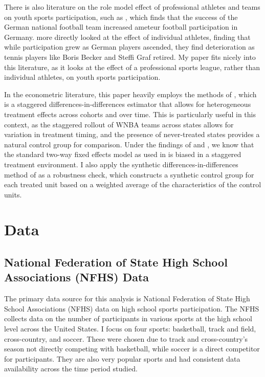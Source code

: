\documentclass[11pt]{article}
\newcommand{\1}[1]{\mathbb{I}\{#1\}}
\theoremstyle{plain}
\begin{document}
There is also literature on the role model effect of professional athletes and teams on youth sports participation, such as \citet{frick_trickle-down_2016}, which finds that the success of the German national football team increased ameteur football participation in Germany. \citet{feddersen_sports_2009} more directly looked at the effect of individual athletes, finding that while participation grew as German players ascended, they find deterioration as tennis players like Boris Becker and Steffi Graf retired. My paper fits nicely into this literature, as it looks at the effect of a professional sports league, rather than individual athletes, on youth sports participation. 

In the econometric literature, this paper heavily employs the methods of \citet{csa_2021}, which is a staggered differences-in-differences estimator that allows for heterogeneous treatment effects across cohorts and over time. This is particularly useful in this context, as the staggered rollout of WNBA teams across states allows for variation in treatment timing, and the presence of never-treated states provides a natural control group for comparison. Under the findings of \citet{goodman-bacon_differences_2021} and \citet{de_chaisemartin_two-way_2020}, we know that the standard two-way fixed effects model as used in \citet{reilly_effects_2024} is biased in a staggered treatment environment. I also apply the synthetic differences-in-differences method of \citet{arkhangelsky_synthetic_2021} as a robustness check, which constructs a synthetic control group for each treated unit based on a weighted average of the characteristics of the control units. 

\section{Data}


\subsection*{National Federation of State High School Associations (NFHS) Data}
The primary data source for this analysis is National Federation of State High School Associations (NFHS) data on high school sports participation. The NFHS collects data on the number of participants in various sports at the high school level across the United States. I focus on four sports: basketball, track and field, cross-country, and soccer. These were chosen due to track and cross-country's season not directly competing with basketball, while soccer is a direct competitor for participants. They are also very popular sports and had consistent data availability across the time period studied. 
\end{document}
